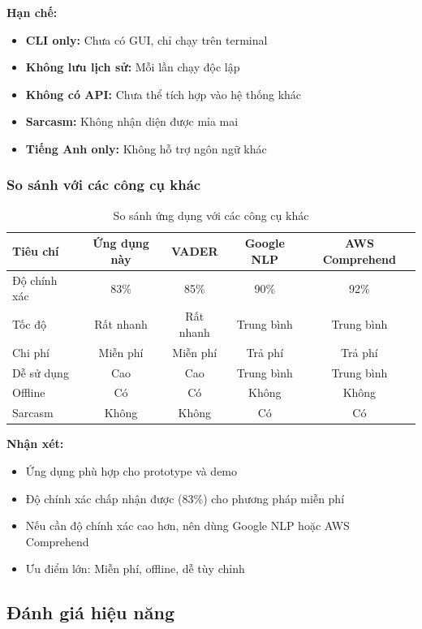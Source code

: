 \textbf{Hạn chế:}
\begin{itemize}
    \item \textbf{CLI only:} Chưa có GUI, chỉ chạy trên terminal
    \item \textbf{Không lưu lịch sử:} Mỗi lần chạy độc lập
    \item \textbf{Không có API:} Chưa thể tích hợp vào hệ thống khác
    \item \textbf{Sarcasm:} Không nhận diện được mỉa mai
    \item \textbf{Tiếng Anh only:} Không hỗ trợ ngôn ngữ khác
\end{itemize}

\subsubsection{So sánh với các công cụ khác}

\begin{table}[H]
\centering
\caption{So sánh ứng dụng với các công cụ khác}
\begin{tabular}{|l|c|c|c|c|}
\hline
\textbf{Tiêu chí} & \textbf{Ứng dụng này} & \textbf{VADER} & \textbf{Google NLP} & \textbf{AWS Comprehend} \\
\hline
Độ chính xác & 83\% & 85\% & 90\% & 92\% \\
\hline
Tốc độ & Rất nhanh & Rất nhanh & Trung bình & Trung bình \\
\hline
Chi phí & Miễn phí & Miễn phí & Trả phí & Trả phí \\
\hline
Dễ sử dụng & Cao & Cao & Trung bình & Trung bình \\
\hline
Offline & Có & Có & Không & Không \\
\hline
Sarcasm & Không & Không & Có & Có \\
\hline
\end{tabular}
\end{table}

\textbf{Nhận xét:}
\begin{itemize}
    \item Ứng dụng phù hợp cho prototype và demo
    \item Độ chính xác chấp nhận được (83\%) cho phương pháp miễn phí
    \item Nếu cần độ chính xác cao hơn, nên dùng Google NLP hoặc AWS Comprehend
    \item Ưu điểm lớn: Miễn phí, offline, dễ tùy chỉnh
\end{itemize}

\subsection{Đánh giá hiệu năng}

